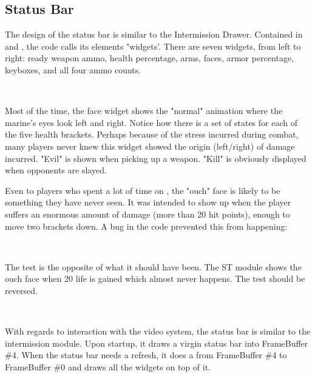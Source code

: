 \subsection{Status Bar}
The design of the status bar is similar to the Intermission Drawer. Contained in  and , the code calls its elements "widgets'. There are seven widgets, from left to right: ready weapon ammo, health percentage, arms, faces, armor percentage, keyboxes, and all four ammo counts.\\
\par
{}
\par

\par
{}\\
\par
Most of the time, the face widget shows the "normal" animation where the marine's eyes look left and right. Notice how there is a set of states for each of the five health brackets. Perhaps because of the stress incurred during combat, many players never knew this widget showed the origin (left/right) of damage incurred. "Evil" is shown when picking up a weapon. "Kill" is obviously displayed when opponents are slayed.\\
\par
Even to players who spent a lot of time on \doom, the "ouch" face is likely to be something they have never seen. It was intended to show up when the player suffers an enormous amount of damage (more than 20 hit points), enough to move two brackets down. A bug in the code prevented this from happening:\\
\par
{}\\
\par
The test is the opposite of what it should have been. The ST module shows the ouch face when 20 life is gained which almost never happens. The test should be reversed.\\
\par
{}\\
\par
With regards to interaction with the video system, the status bar is similar to the intermission module. Upon startup, it draws a virgin status bar into FrameBuffer \#4. When the status bar needs a refresh, it does a  from FrameBuffer \#4 to FrameBuffer \#0 and draws all the widgets on top of it.\\
\par
{}


